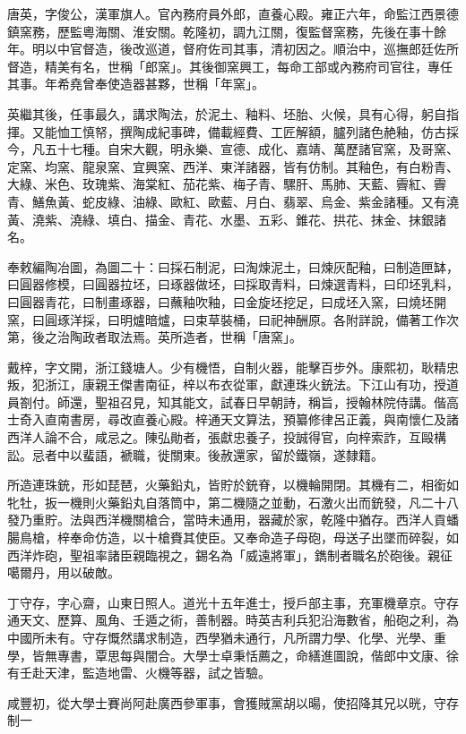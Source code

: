 \begin{pinyinscope}
唐英，字俊公，漢軍旗人。官內務府員外郎，直養心殿。雍正六年，命監江西景德鎮窯務，歷監粵海關、淮安關。乾隆初，調九江關，復監督窯務，先後在事十餘年。明以中官督造，後改巡道，督府佐司其事，清初因之。順治中，巡撫郎廷佐所督造，精美有名，世稱「郎窯」。其後御窯興工，每命工部或內務府司官往，專任其事。年希堯曾奉使造器甚夥，世稱「年窯」。

英繼其後，任事最久，講求陶法，於泥土、釉料、坯胎、火候，具有心得，躬自指揮。又能恤工慎帑，撰陶成紀事碑，備載經費、工匠解額，臚列諸色赩釉，仿古採今，凡五十七種。自宋大觀，明永樂、宣德、成化、嘉靖、萬歷諸官窯，及哥窯、定窯、均窯、龍泉窯、宜興窯、西洋、東洋諸器，皆有仿制。其釉色，有白粉青、大綠、米色、玫瑰紫、海棠紅、茄花紫、梅子青、騾肝、馬肺、天藍、霽紅、霽青、鱔魚黃、蛇皮綠、油綠、歐紅、歐藍、月白、翡翠、烏金、紫金諸種。又有澆黃、澆紫、澆綠、填白、描金、青花、水墨、五彩、錐花、拱花、抹金、抹銀諸名。

奉敕編陶冶圖，為圖二十：曰採石制泥，曰淘煉泥土，曰煉灰配釉，曰制造匣缽，曰圓器修模，曰圓器拉坯，曰琢器做坯，曰採取青料，曰煉選青料，曰印坯乳料，曰圓器青花，曰制畫琢器，曰蘸釉吹釉，曰金旋坯挖足，曰成坯入窯，曰燒坯開窯，曰圓琢洋採，曰明爐暗爐，曰束草裝桶，曰祀神酬原。各附詳說，備著工作次第，後之治陶政者取法焉。英所造者，世稱「唐窯」。

戴梓，字文開，浙江錢塘人。少有機悟，自制火器，能擊百步外。康熙初，耿精忠叛，犯浙江，康親王傑書南征，梓以布衣從軍，獻連珠火銃法。下江山有功，授道員劄付。師還，聖祖召見，知其能文，試春日早朝詩，稱旨，授翰林院侍講。偕高士奇入直南書房，尋改直養心殿。梓通天文算法，預纂修律呂正義，與南懷仁及諸西洋人論不合，咸忌之。陳弘勛者，張獻忠養子，投誠得官，向梓索詐，互毆構訟。忌者中以蜚語，褫職，徙關東。後赦還家，留於鐵嶺，遂隸籍。

所造連珠銃，形如琵琶，火藥鉛丸，皆貯於銃脊，以機輪開閉。其機有二，相銜如牝牡，扳一機則火藥鉛丸自落筒中，第二機隨之並動，石激火出而銃發，凡二十八發乃重貯。法與西洋機關槍合，當時未通用，器藏於家，乾隆中猶存。西洋人貢蟠腸鳥槍，梓奉命仿造，以十槍賚其使臣。又奉命造子母砲，母送子出墜而碎裂，如西洋炸砲，聖祖率諸臣親臨視之，錫名為「威遠將軍」，鐫制者職名於砲後。親征噶爾丹，用以破敵。

丁守存，字心齋，山東日照人。道光十五年進士，授戶部主事，充軍機章京。守存通天文、歷算、風角、壬遁之術，善制器。時英吉利兵犯沿海數省，船砲之利，為中國所未有。守存慨然講求制造，西學猶未通行，凡所謂力學、化學、光學、重學，皆無專書，覃思每與闇合。大學士卓秉恬薦之，命繕進圖說，偕郎中文康、徐有壬赴天津，監造地雷、火機等器，試之皆驗。

咸豐初，從大學士賽尚阿赴廣西參軍事，會獲賊黨胡以暘，使招降其兄以晄，守存制一


\end{pinyinscope}
